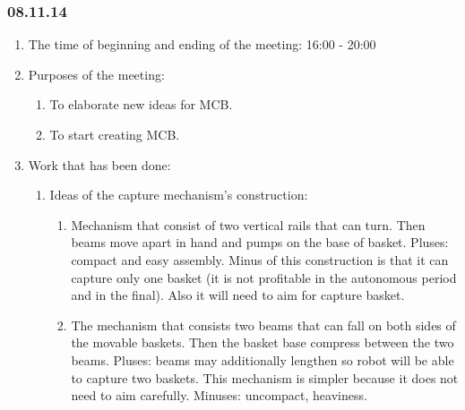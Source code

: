 
\subsubsection{08.11.14}

\begin{enumerate}
	\item The time of beginning and ending of the meeting:
	16:00 - 20:00
	\item Purposes of the meeting:
	\begin{enumerate}
		\item To elaborate new ideas for MCB.
		
		\item To start creating MCB.
		
	\end{enumerate}
	
	\item Work that has been done:
	\begin{enumerate}
		\item Ideas of the capture mechanism's construction:
		\begin{enumerate}
			\item Mechanism that consist of two vertical rails that can turn. Then beams move apart in hand and pumps on the base of basket. Pluses: compact and easy assembly. Minus of this construction is that it can capture only one basket (it is not profitable in the autonomous period and in the final). Also it will need to aim for capture basket.
			
			\item The mechanism that consists two beams that can fall on both sides of the movable baskets. Then the basket base compress between the two beams. Pluses: beams may additionally lengthen so robot will be able to capture two baskets. This mechanism is simpler because it does not need to aim carefully. Minuses: uncompact, heaviness.
		

\end{enumerate}
\end{enumerate}
\end{enumerate}
